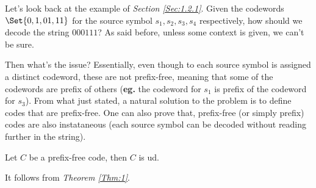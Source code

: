 \documentclass{subfiles}
\begin{document}
    Let's look back at the example of \emph{Section \ref{Sec:1.2.1}}. 
    Given the codewords \(\Set{0, 1, 01, 11}\) for the source symbol \(s_{1},
    s_{2}, s_{3}, s_{4}\) respectively, how should we decode the string \(000111\)?
    As said before, unless some context is given, we can't be sure.

    Then what's the issue? 
    Essentially, even though to each source symbol is assigned a distinct codeword,
    these are not prefix-free, meaning that some of the codewords are prefix of others
    (\textbf{eg.} the codeword for \(s_{1}\) is prefix of the codeword for \(s_{3}\)).
    From what just stated, a natural solution to the problem is to define codes 
    that are prefix-free.
        One can also prove that, prefix-free (or simply prefix) codes are also instataneous (each 
    source symbol can be decoded without reading further in the string).
    \begin{theorem*}
        Let \(C\) be a prefix-free code, then \(C\) is \gls{ud}.
    \end{theorem*}
    \begin{proof*}
        It follows from \emph{Theorem \ref{Thm:1}}.
    \end{proof*}
\end{document}
